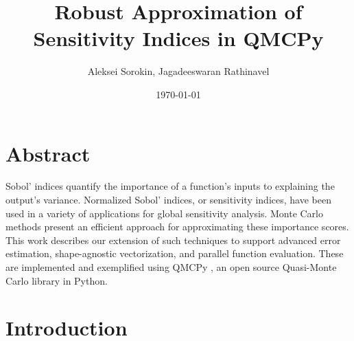 \documentclass{article}[12pt]
\title{Robust Approximation of Sensitivity Indices in QMCPy}
\author{Aleksei Sorokin, Jagadeeswaran Rathinavel}
\date{\today}
\begin{document}
\maketitle


\section{Abstract}


Sobol' indices quantify the importance of a function's inputs to explaining the output's variance.  Normalized Sobol' indices, or sensitivity indices, have been used in a variety of applications for global sensitivity analysis. Monte Carlo methods present an efficient approach for approximating these importance scores. This work describes our extension of such techniques to support advanced error estimation, shape-agnostic vectorization, and parallel function evaluation. These are implemented and exemplified using QMCPy \cite{QMCPy}, an open source Quasi-Monte Carlo library in Python. %


\section{Introduction}

\end{document}

